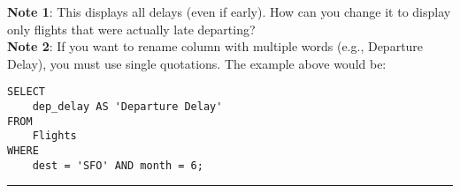 \documentclass{article}
\begin{document}
\noindent \textbf{Note 1}: This displays all delays (even if early).  How can you change it to display only flights that were actually late departing?\\

 
 
\noindent \textbf{Note 2}: If you want to rename column with multiple words (e.g., Departure Delay), you must use single quotations. The example above would be:  
 

\begin{lstlisting}[frame=single]
SELECT 
    dep_delay AS 'Departure Delay'
FROM
    Flights
WHERE
    dest = 'SFO' AND month = 6; 

\end{lstlisting} 



\hspace{-0.5cm}\rule[0.101in]{\textwidth}{0.0025in}














  



 
\end{document}

